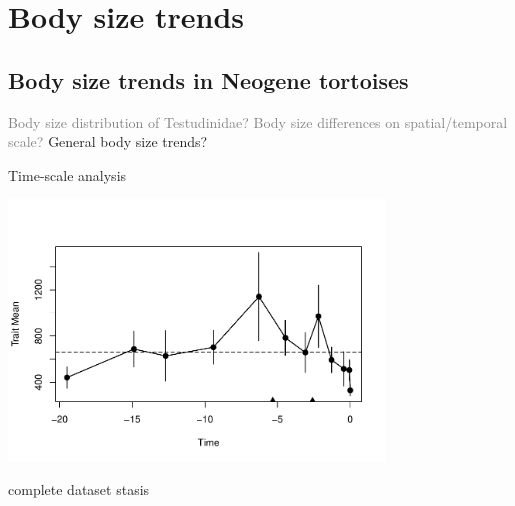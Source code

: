 



\section{Body size trends}

\subsection{Body size trends in Neogene tortoises}


\begin{frame}
\begin{enumerate}
	
	\p \textcolor{gray}{Body size distribution of Testudinidae?
		\bigskip
		\p Body size differences on spatial/temporal scale? }
	\bigskip
	\p General body size trends?
\end{enumerate}
\end{frame}


\begin{frame}{Time-scale analysis}
\begin{center}
	\includegraphics[width=0.75\textwidth]{MA_JJ_files/figure-latex/paleoTSAll-1.pdf}
\end{center}
complete dataset \pf stasis
\end{frame}

